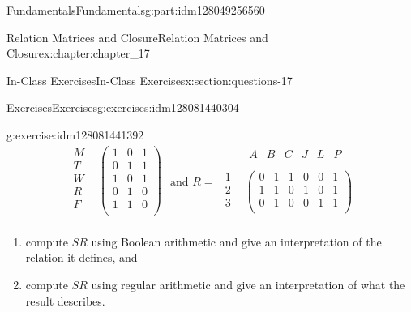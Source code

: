 \documentclass[oneside,10pt,]{book}
\numberwithin{equation}{section}
\begin{document}
\begin{partptx}{Fundamentals}{}{Fundamentals}{}{}{g:part:idm128049256560}
\begin{chapterptx}{Relation Matrices and Closure}{}{Relation Matrices and Closure}{}{}{x:chapter:chapter_17}
\begin{sectionptx}{In-Class Exercises}{}{In-Class Exercises}{}{}{x:section:questions-17}
\begin{exercises-subsection}{Exercises}{}{Exercises}{}{}{g:exercises:idm128081440304}
\begin{exercisegroup}
\begin{divisionexerciseeg}{1}{}{}{g:exercise:idm128081441392}
\begin{equation*}
\begin{array}{cc}
\begin{array}{c}
M \\
T \\
W \\
R \\
F \\
\end{array}
& 
\left(
\begin{array}{ccc}
1 & 0 & 1 \\
0 & 1 & 1 \\
1 & 0 & 1 \\
0 & 1 & 0 \\
1 & 1 & 0 \\
\end{array}
\right) \\
\end{array}
\textrm{ and }R=
\begin{array}{cc}
& 
\begin{array}{cccccc}
A & B & C & J & L & P \\
\end{array}
\\
\begin{array}{c}
1 \\
2 \\
3 \\
\end{array}
& \left(
\begin{array}{cccccc}
0 & 1 & 1 & 0 & 0 & 1 \\
1 & 1 & 0 & 1 & 0 & 1 \\
0 & 1 & 0 & 0 & 1 & 1 \\
\end{array}
\right) \\
\end{array}
\end{equation*}
%
\par
%
\begin{enumerate}[label=(\alph*)]
\item{}compute \(S R\) using Boolean arithmetic and give an interpretation of the relation it defines, and%
\item{}compute \(S R\) using regular arithmetic and give an interpretation of what the result describes.%
\end{enumerate}
%
\end{divisionexerciseeg}%
\end{exercisegroup}
\end{exercises-subsection}
\end{sectionptx}
\end{chapterptx}
\end{partptx}
\end{document}
